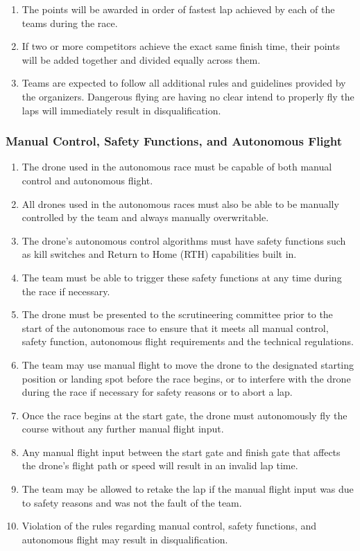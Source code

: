 \begin{enumerate}
    \item The points will be awarded in order of fastest lap achieved by each of the teams during the race.
    \item If two or more competitors achieve the exact same finish time, their points will be added together and divided equally across them.
    \item Teams are expected to follow all additional rules and guidelines provided by the organizers. Dangerous flying are having no clear intend to properly fly the laps will immediately result in disqualification.
    \end{enumerate}

    \subsubsection{Manual Control, Safety Functions, and Autonomous Flight}
    \begin{enumerate}[resume]
    \item The drone used in the autonomous race must be capable of both manual control and autonomous flight.
    \item All drones used in the autonomous races must also be able to be manually controlled by the team and always manually overwritable.
    \item The drone's autonomous control algorithms must have safety functions such as kill switches and Return to Home (RTH) capabilities built in.
    \item The team must be able to trigger these safety functions at any time during the race if necessary.
    \item The drone must be presented to the scrutineering committee prior to the start of the autonomous race to ensure that it meets all manual control, safety function, autonomous flight requirements and the technical regulations.
    \item The team may use manual flight to move the drone to the designated starting position or landing spot before the race begins, or to interfere with the drone during the race if necessary for safety reasons or to abort a lap.
    \item Once the race begins at the start gate, the drone must autonomously fly the course without any further manual flight input.
    \item Any manual flight input between the start gate and finish gate that affects the drone's flight path or speed will result in an invalid lap time.
    \item The team may be allowed to retake the lap if the manual flight input was due to safety reasons and was not the fault of the team.
    \item Violation of the rules regarding manual control, safety functions, and autonomous flight may result in disqualification.
    \end{enumerate}





